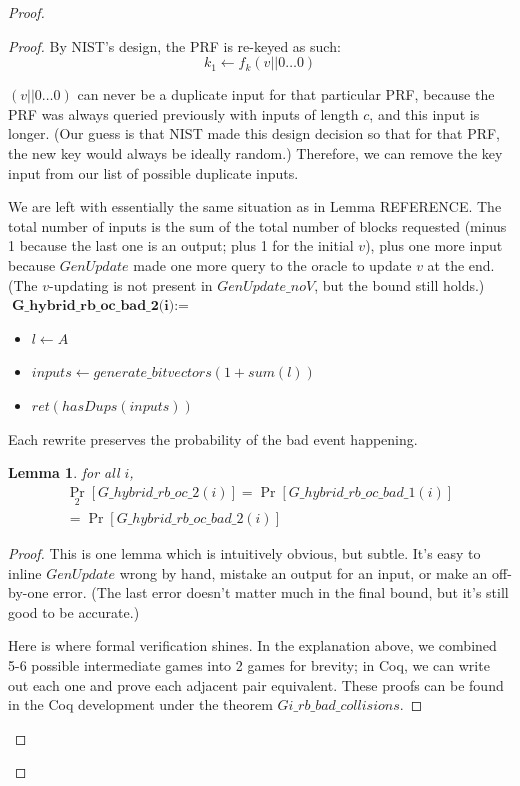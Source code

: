 \documentclass[12pt,lot, lof]{puthesis}
\newenvironment{game}
{ \begin{itemize}[noitemsep,nolistsep] 
}
{ \end{itemize}                  }
\newcommand{\lar}{\leftarrow}
\newtheorem{lem}{Lemma}[thm]
\begin{document}
{\begin{proof}
\begin{proof}
By NIST's design, the PRF is re-keyed as such:
$$k_1 \lar f_k(v || 0 \ldots 0)$$

$(v||0 \ldots 0)$ can never be a duplicate input for that particular PRF, because the PRF was always queried previously with inputs of length $c$, and this input is longer. (Our guess is that NIST made this design decision so that for that PRF, the new key would always be ideally random.) Therefore, we can remove the key input from our list of possible duplicate inputs. 

We are left with essentially the same situation as in Lemma REFERENCE. The total number of inputs is the sum of the total number of blocks requested (minus 1 because the last one is an output; plus 1 for the initial $v$), plus one more input because $GenUpdate$ made one more query to the oracle to update $v$ at the end. (The $v$-updating is not present in $GenUpdate\_noV$, but the bound still holds.)\\

$\textbf{G\_hybrid\_rb\_oc\_bad\_2(i)} := $
\begin{game}
\item[] $l \lar A$
\item[] $inputs \lar generate\_bitvectors(1 + sum(l))$
\item[] $ret(hasDups(inputs))$ \\
\end{game}

Each rewrite preserves the probability of the bad event happening.

\begin{lem} for all $i$,
  \begin{gather*}
    \Pr_2[G\_hybrid\_rb\_oc\_2(i)] = \Pr[G\_hybrid\_rb\_oc\_bad\_1(i)]\\
    = \Pr[G\_hybrid\_rb\_oc\_bad\_2(i)]
  \end{gather*}
\end{lem}
\begin{proof}
This is one lemma which is intuitively obvious, but subtle. It's easy to inline $GenUpdate$ wrong by hand, mistake an output for an input, or make an off-by-one error. (The last error doesn't matter much in the final bound, but it's still good to be accurate.) 

Here is where formal verification shines. In the explanation above, we combined 5-6 possible intermediate games into 2 games for brevity; in Coq, we can write out each one and prove each adjacent pair equivalent. These proofs can be found in the Coq development under the theorem $Gi\_rb\_bad\_collisions$.
\end{proof}


\end{proof}
\end{proof}}
\end{document}
